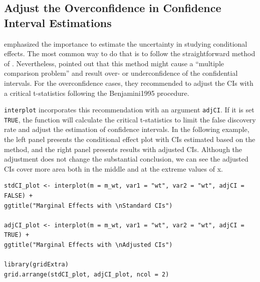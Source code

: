 \documentclass[
  article]{jss}
\begin{document}
\hypertarget{sec-adjust-the-overconfidence-in-confidence-interval-estimations}{%
\subsection{Adjust the Overconfidence in Confidence Interval
Estimations}\label{sec-adjust-the-overconfidence-in-confidence-interval-estimations}}

\citep{BerryDeMerittEsarey2016} emphasized the importance to estimate
the uncertainty in studying conditional effects. The most common way to
do that is to follow the straightforward method of
\citep{BramborClarkGolder2006}. Nevertheless, \citep{EsareySumner2018}
pointed out that this method might cause a ``multiple comparison
problem'' and result over- or underconfidence of the confidential
intervals. For the overconfidence cases, they recommended to adjust the
CIs with a critical t-statistics following the Benjamini1995 procedure.

\texttt{interplot} incorporates this recommendation with an argument
\texttt{adjCI}. If it is set \texttt{TRUE}, the function will calculate
the critical t-statistics to limit the false discovery rate and adjust
the estimation of confidence intervals. In the following example, the
left panel presents the conditional effect plot with CIs estimated based
on the \citep{BramborClarkGolder2006} method, and the right panel
presents results with adjusted CIs. Although the adjustment does not
change the substantial conclusion, we can see the adjusted CIs cover
more area both in the middle and at the extreme values of x.

\begin{verbatim}
stdCI_plot <- interplot(m = m_wt, var1 = "wt", var2 = "wt", adjCI = FALSE) +
ggtitle("Marginal Effects with \nStandard CIs")

adjCI_plot <- interplot(m = m_wt, var1 = "wt", var2 = "wt", adjCI = TRUE) +
ggtitle("Marginal Effects with \nAdjusted CIs")

library(gridExtra)
grid.arrange(stdCI_plot, adjCI_plot, ncol = 2)
\end{verbatim}
\end{document}
